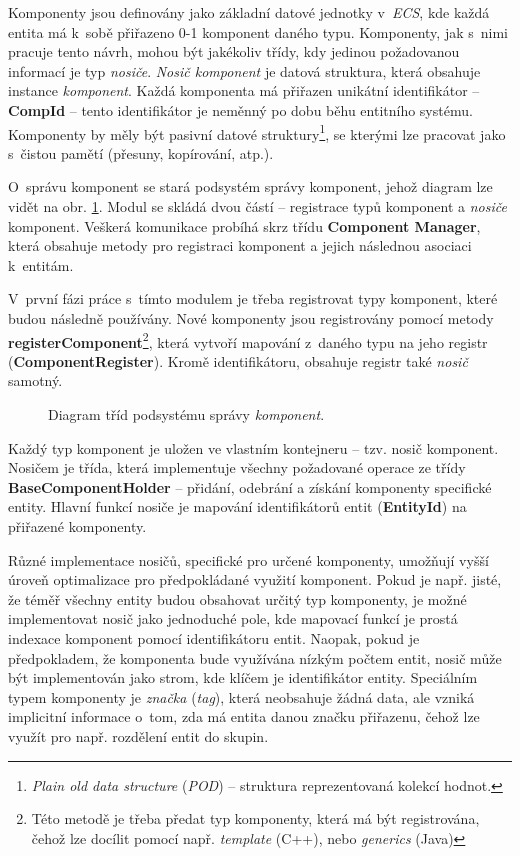 Komponenty jsou definovány jako základní datové jednotky v~\emph{ECS}, kde každá entita má k~sobě přiřazeno 0-1 komponent daného typu. Komponenty, jak s~nimi pracuje tento návrh, mohou být jakékoliv třídy, kdy jedinou požadovanou informací je typ \emph{nosiče}. \emph{Nosič komponent} je datová struktura, která obsahuje instance \emph{komponent}. Každá komponenta má přiřazen unikátní identifikátor -- \textbf{CompId} -- tento identifikátor je neměnný po dobu běhu entitního systému. Komponenty by měly být pasivní datové struktury\footnote{\emph{Plain old data structure} (\emph{POD}) -- struktura reprezentovaná kolekcí hodnot.}, se kterými lze pracovat jako s~čistou pamětí (přesuny, kopírování, atp.).

O~správu komponent se stará podsystém správy komponent, jehož diagram lze vidět na obr. \ref{Fig:DESCompDiag}. Modul se skládá dvou částí -- registrace typů komponent a \emph{nosiče} komponent. Veškerá komunikace probíhá skrz třídu \textbf{Component Manager}, která obsahuje metody pro registraci komponent a jejich následnou asociaci k~entitám. 

V~první fázi práce s~tímto modulem je třeba registrovat typy komponent, které budou následně používány. Nové komponenty jsou registrovány pomocí metody \textbf{registerComponent}\footnote{Této metodě je třeba předat typ komponenty, která má být registrována, čehož lze docílit pomocí např. \emph{template} (C++), nebo \emph{generics} (Java)}, která vytvoří mapování z~daného typu na jeho registr (\textbf{ComponentRegister}). Kromě identifikátoru, obsahuje registr také \emph{nosič} samotný.

\begin{figure}[H]
	\centering
	\caption{Diagram tříd podsystému správy \emph{komponent}.}
	\label{Fig:DESCompDiag}
\end{figure}

Každý typ komponent je uložen ve vlastním kontejneru -- tzv. nosič komponent. Nosičem je třída, která implementuje všechny požadované operace ze třídy \textbf{BaseComponentHolder} -- přidání, odebrání a získání komponenty specifické entity. Hlavní funkcí nosiče je mapování identifikátorů entit (\textbf{EntityId}) na přiřazené komponenty. 

Různé implementace nosičů, specifické pro určené komponenty, umožňují vyšší úroveň optimalizace pro předpokládané využití komponent. Pokud je např. jisté, že téměř všechny entity budou obsahovat určitý typ komponenty, je možné implementovat nosič jako jednoduché pole, kde mapovací funkcí je prostá indexace komponent pomocí identifikátoru entit. Naopak, pokud je předpokladem, že komponenta bude využívána nízkým počtem entit, nosič může být implementován jako strom, kde klíčem je identifikátor entity. Speciálním typem komponenty je \emph{značka} (\emph{tag}), která neobsahuje žádná data, ale vzniká implicitní informace o~tom, zda má entita danou značku přiřazenu, čehož lze využít pro např. rozdělení entit do skupin.

